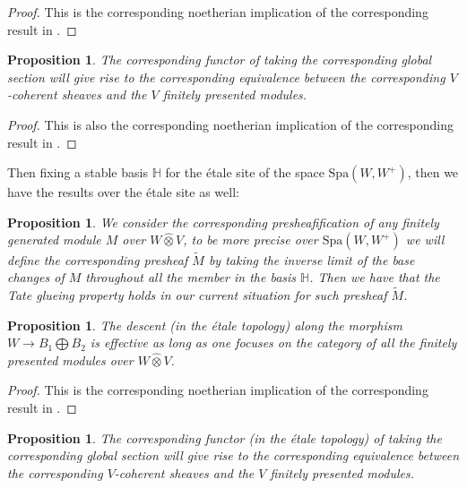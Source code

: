 \documentclass[12pt]{amsart}
\newtheorem{proposition}[theorem]{Proposition}
\theoremstyle{definition}
\numberwithin{equation}{section}
\begin{document}
\begin{proof}
This is the corresponding noetherian implication of the corresponding result in \cite[Lemma 2.14]{TX2}.	
\end{proof}


\begin{proposition}
The corresponding functor of taking the corresponding global section will give rise to the corresponding equivalence between the corresponding $V$-coherent sheaves and the $V$ finitely presented modules.
\end{proposition}


\begin{proof}
This is also the corresponding noetherian implication of the corresponding result in \cite[Theorem 2.15]{TX2}.	
\end{proof}


\indent Then fixing a stable basis $\mathbb{H}$ for the \'etale site of the space $\mathrm{Spa}(W,W^+)$, then we have the results over the \'etale site as well:


\begin{proposition}
We consider the corresponding presheafification of any finitely generated module $M$ over $W\widehat{\otimes}V$, to be more precise over $\mathrm{Spa}(W,W^+)$ we will define the corresponding presheaf $\widetilde{M}$ by taking the inverse limit of the base changes of $M$ throughout all the member in the basis $\mathbb{H}$. Then we have that the Tate glueing property holds in our current situation for such presheaf $\widetilde{M}$.
\end{proposition}



\begin{proposition}
The descent (in the \'etale topology) along the morphism $W\rightarrow B_1\bigoplus B_2$ is effective as long as one focuses on the category of all the finitely presented modules over $W\widehat{\otimes}V$. 	
\end{proposition}

\begin{proof}
This is the corresponding noetherian implication of the corresponding result in \cite[Lemma 2.22]{TX2}.	
\end{proof}


\begin{proposition} \label{proposition6.9}
The corresponding functor (in the \'etale topology) of taking the corresponding global section will give rise to the corresponding equivalence between the corresponding $V$-coherent sheaves and the $V$ finitely presented modules.
\end{proposition}
\end{document}
